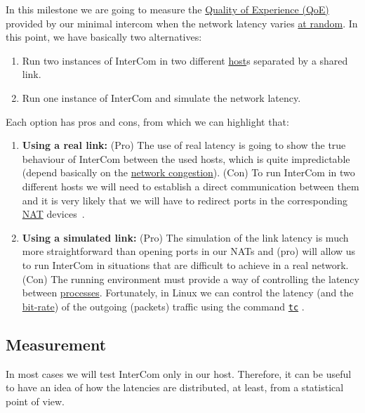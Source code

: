 In this milestone we are going to measure the
\href{https://en.wikipedia.org/wiki/Quality_of_experience}{Quality of
  Experience (QoE)} provided by our minimal intercom when the network
latency varies \href{https://en.wikipedia.org/wiki/Randomness}{at
  random}. In this point, we have basically two alternatives:
\begin{enumerate}
\item Run two instances of InterCom in two different
  \href{https://en.wikipedia.org/wiki/Host_(network)}{host}s separated
  by a shared link.
\item Run one instance of InterCom and simulate the network latency.
\end{enumerate}
Each option has pros and cons, from which we can highlight that:
\begin{enumerate}
\item \textbf{Using a real link:} (Pro) The use of real latency is
  going to show the true behaviour of InterCom between the used hosts,
  which is quite impredictable (depend basically on the
  \href{https://en.wikipedia.org/wiki/Network_congestion}{network
    congestion}). (Con) To run InterCom in two different hosts we will
  need to establish a direct communication between them and it is very
  likely that we will have to redirect ports in the corresponding
  \href{https://en.wikipedia.org/wiki/Network_address_translation}{NAT}
  devices~\cite{srisuresh1999nat}.
\item \textbf{Using a simulated link:} (Pro) The simulation of the
  link latency is much more straightforward than opening ports in our
  NATs and (pro) will allow us to run InterCom in situations that
  are difficult to achieve in a real network. (Con) The running
  environment must provide a way of controlling the latency between
  \href{https://en.wikipedia.org/wiki/Process_(computing)}{processes}. Fortunately,
  in Linux we can control the latency (and the
  \href{https://en.wikipedia.org/wiki/Bit_rate}{bit-rate}) of the
  outgoing (packets) traffic using the command
  \href{https://man7.org/linux/man-pages/man8/tc.8.html}{\texttt{tc}}
  \cite{bert2012lartc}.
\end{enumerate}

\subsection{Measurement}
In most cases we will test InterCom only in our host. Therefore, it
can be useful to have an idea of how the latencies are distributed, at
least, from a statistical point of view.

